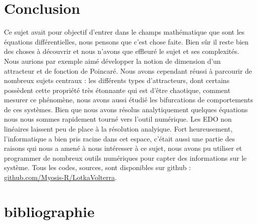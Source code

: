 \documentclass{wsdcr}
\begin{document}
\section{Conclusion}
Ce sujet avait pour objectif d'entrer dans le champs mathématique que sont les équations différentielles, nous pensons que c'est chose faite. Bien sûr il reste bien des choses à découvrir et nous n'avons que effleuré le sujet et ses complexités. Nous aurions par exemple aimé développer la notion de dimension d'un attracteur et de fonction de Poincaré. Nous avons cependant réussi à parcourir de nombreux sujets centraux : les différents types d'attracteurs, dont certains possèdent cette propriété très étonnante qui est d'être chaotique, comment mesurer ce phénomène, nous avons aussi étudié les bifurcations de comportements de ces systèmes. Bien que nous avons résolus analytiquement quelques équations nous nous sommes rapidement tourné vers l'outil numérique. Les EDO non linéaires laissent peu de place à la résolution analyique. Fort heureusement, l'informatique a bien pris racine dans cet espace, c'était aussi une partie des raisons qui nous a amené à nous intéresser à ce sujet, nous avons pu utiliser et programmer de nombreux outils numériques pour capter des informations sur le système. Tous les codes, sources, sont disponibles sur github : \url{github.com/Myosis-R/LotkaVolterra}.

\section{bibliographie}
\nocite{*}
\printbibliography



%
\end{document}
